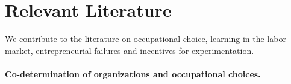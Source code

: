 \documentclass[12pt,american]{paper}
\theoremstyle{remark}
\begin{document}
\section{Relevant Literature}

We contribute to the literature on occupational choice, learning in the labor market, entrepreneurial failures and incentives for experimentation. 

\paragraph{Co-determination of organizations and occupational choices.} 




\end{document}
